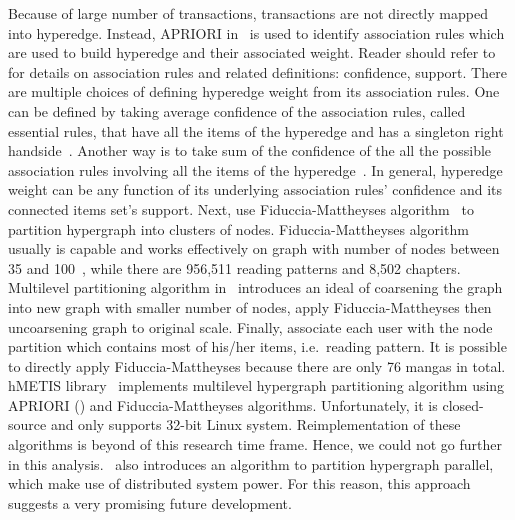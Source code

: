 \documentclass[English]{dicomopapers}
\begin{document}
Because of large number of transactions, transactions are not directly mapped into hyperedge. Instead, APRIORI in~\cite{agrawal1994fast} is used to identify association rules which are used to build hyperedge and their associated weight. Reader should refer to~\cite{agrawal1994fast} for details on association rules and related definitions: confidence, support. There are multiple choices of defining hyperedge weight from its association rules. One can be defined by taking average confidence of the association rules, called essential rules, that have all the items of the hyperedge and has a singleton right handside~\cite{summary_hyper}. Another way is to take sum of the confidence of the all the possible association rules involving all the items of the hyperedge~\cite{han1997clustering}. In general, hyperedge weight can be any function of its underlying association rules' confidence and its connected items set's support. Next, use Fiduccia-Mattheyses algorithm~\cite{1585498} to partition hypergraph into clusters of nodes. Fiduccia-Mattheyses algorithm usually is capable and works effectively on graph with number of nodes between 35 and 100~\cite{hmetis}, while there are 956,511 reading patterns and 8,502 chapters. Multilevel partitioning algorithm in~\cite{karypis1999multilevel} introduces an ideal of coarsening the graph into new graph with smaller number of nodes, apply Fiduccia-Mattheyses then uncoarsening graph to original scale. Finally, associate each user with the node partition which contains most of his/her items, i.e.\ reading pattern. It is possible to directly apply Fiduccia-Mattheyses because there are only 76 mangas in total.\newline
hMETIS library~\cite{karypis1999multilevel,hmetis} implements multilevel hypergraph partitioning algorithm using APRIORI (\cite{agrawal1994fast}) and Fiduccia-Mattheyses algorithms. Unfortunately, it is closed-source and only supports 32-bit Linux system. Reimplementation of these algorithms is beyond of this research time frame. Hence, we could not go further in this analysis.~\cite{devine2006parallel} also introduces an algorithm to partition hypergraph parallel, which make use of distributed system power. For this reason, this approach suggests a very promising future development.
\end{document}
